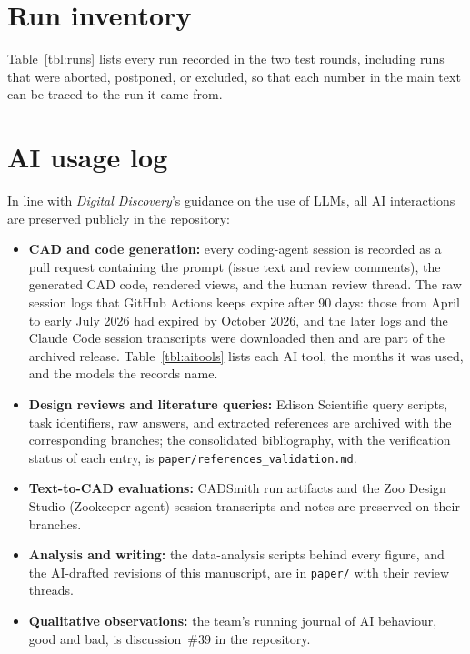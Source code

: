 \documentclass[10pt]{article}
\begin{document}


\section{Run inventory}
\label{sec:runs}

Table~\ref{tbl:runs} lists every run recorded in the two test rounds, including
runs that were aborted, postponed, or excluded, so that each number in the main
text can be traced to the run it came from.

\small

\normalsize

\section{AI usage log}
\label{sec:ailog}

In line with \textit{Digital Discovery}'s guidance on the use of LLMs, all AI
interactions are preserved publicly in the repository:

\begin{itemize}
\item \textbf{CAD and code generation:} every coding-agent session is recorded
as a pull request containing the prompt (issue text and review comments), the
generated CAD code, rendered views, and the human review thread. The raw
session logs that GitHub Actions keeps expire after 90 days: those from April to
early July 2026 had expired by October 2026, and the later logs and the Claude Code
session transcripts were downloaded then and are part of the archived release.
Table~\ref{tbl:aitools} lists each AI tool, the months it was used, and the
models the records name.
\item \textbf{Design reviews and literature queries:} Edison Scientific query
scripts, task identifiers, raw answers, and extracted references are archived
with the corresponding branches; the consolidated bibliography, with the
verification status of each entry, is \texttt{paper/references\_validation.md}.
\item \textbf{Text-to-CAD evaluations:} CADSmith run artifacts and the Zoo
Design Studio (Zookeeper agent) session transcripts and notes are preserved on
their branches.
\item \textbf{Analysis and writing:} the data-analysis scripts behind every
figure, and the AI-drafted revisions of this manuscript, are in
\texttt{paper/} with their review threads.
\item \textbf{Qualitative observations:} the team's running journal of AI
behaviour, good and bad, is discussion~\#39 in the repository.
\end{itemize}
\end{document}

